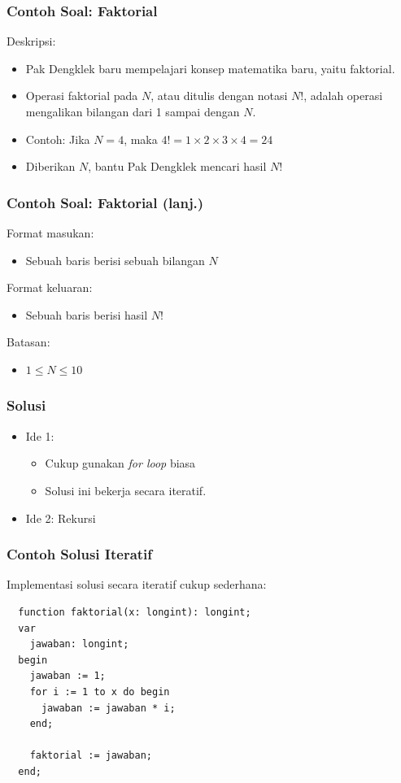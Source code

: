 \begin{frame}
\frametitle{Contoh Soal: Faktorial}
Deskripsi:
\begin{itemize}
  \item Pak Dengklek baru mempelajari konsep matematika baru, yaitu faktorial.
  \item Operasi faktorial pada $N$, atau ditulis dengan notasi $N$!, adalah operasi mengalikan bilangan dari 1 sampai dengan $N$.
  \item Contoh: Jika $N = 4$, maka $4! = 1 \times 2 \times 3 \times 4 = 24$
  \item Diberikan $N$, bantu Pak Dengklek mencari hasil $N$!
\end{itemize}
\end{frame}

\begin{frame}
\frametitle{Contoh Soal: Faktorial (lanj.) }
Format masukan:
\begin{itemize}
  \item Sebuah baris berisi sebuah bilangan $N$
\end{itemize}
Format keluaran:
\begin{itemize}
  \item Sebuah baris berisi hasil $N$!
\end{itemize}
Batasan:
\begin{itemize}
  \item $1 \le N \le 10$
\end{itemize}
\end{frame}

\begin{frame}
\frametitle{Solusi}
\begin{itemize}
  \item Ide 1:
  \begin{itemize}
    \item Cukup gunakan \textit{for loop} biasa
    \item Solusi ini bekerja secara iteratif.
  \end{itemize}
  \item Ide 2: Rekursi 
\end{itemize}
\end{frame}

\begin{frame}[fragile]
\frametitle{Contoh Solusi Iteratif}
Implementasi solusi secara iteratif cukup sederhana:
\begin{lstlisting}    
  function faktorial(x: longint): longint;
  var
    jawaban: longint;
  begin
    jawaban := 1; 
    for i := 1 to x do begin
      jawaban := jawaban * i;
    end;
    
    faktorial := jawaban;
  end;
\end{lstlisting}
\end{frame}

